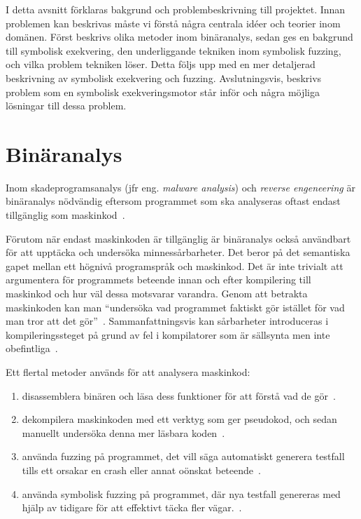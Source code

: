 I detta avsnitt förklaras bakgrund och problembeskrivning till projektet. Innan
problemen kan beskrivas måste vi förstå några centrala idéer och teorier inom
domänen. Först beskrivs olika metoder inom binäranalys, sedan ges en bakgrund
till symbolisk exekvering, den underliggande tekniken inom symbolisk fuzzing, och vilka
problem tekniken löser. Detta följs upp med en mer detaljerad beskrivning av symbolisk
exekvering och fuzzing. Avslutningsvis, beskrivs problem som en symbolisk exekveringsmotor
står inför och några möjliga lösningar till dessa problem.

\section{Binäranalys}
\label{sec:binar_analys}
Inom skadeprogramsanalys (jfr eng. \emph{malware analysis}) och \emph{reverse engeneering}
är binäranalys nödvändig eftersom programmet som ska analyseras oftast endast
tillgänglig som maskinkod~\cite{andriesse2018}.

Förutom när endast maskinkoden är tillgänglig är binäranalys också användbart
för att upptäcka och undersöka minnessårbarheter. Det beror på det semantiska
gapet mellan ett högnivå programspråk och maskinkod. Det är inte trivialt att
argumentera för programmets beteende innan och efter kompilering till maskinkod
och hur väl dessa motsvarar varandra. Genom att betrakta maskinkoden kan man
``undersöka vad programmet faktiskt gör istället för vad man tror att det
gör''~\cite{andriesse2018}. Sammanfattningsvis kan sårbarheter introduceras i
kompileringssteget på grund av fel i kompilatorer som är sällsynta men
inte obefintliga~\cite{silentbugsmatter}.

Ett flertal metoder används för att analysera maskinkod:
\begin{enumerate}
    \item disassemblera binären och läsa dess funktioner för att förstå vad de gör~\cite{ghidra_website}.
    \item dekompilera maskinkoden med ett verktyg som ger pseudokod, och sedan manuellt undersöka denna mer läsbara koden~\cite{ghidra_website}.
    \item använda fuzzing på programmet, det vill säga automatiskt generera testfall tills ett orsakar en crash eller
          annat oönskat beteende~\cite{8371326}.
    \item använda symbolisk fuzzing på programmet, där nya testfall genereras med hjälp av tidigare för att effektivt täcka fler vägar.~\cite{sage}.
\end{enumerate}

